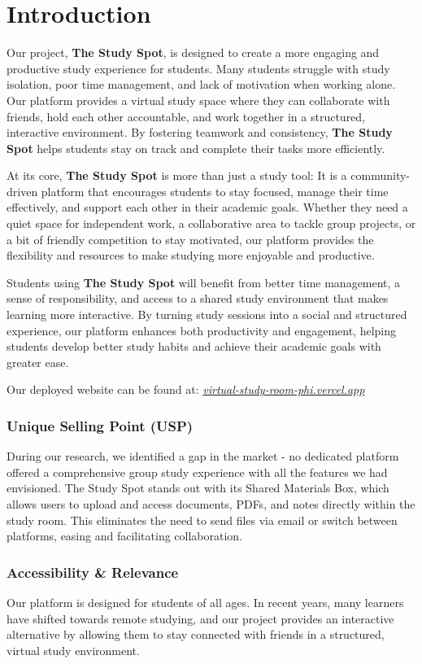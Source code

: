 \chapter{Introduction}
\label{chap:introduction}
Our project, \textbf{The Study Spot}, is designed to create a more engaging and productive study experience for students. Many students struggle with study isolation, poor time management, and lack of motivation when working alone. Our platform provides a virtual study space where they can collaborate with friends, hold each other accountable, and work together in a structured, interactive environment. By fostering teamwork and consistency, \textbf{The Study Spot} helps students stay on track and complete their tasks more efficiently.  

At its core, \textbf{The Study Spot} is more than just a study tool: It is a community-driven platform that encourages students to stay focused, manage their time effectively, and support each other in their academic goals. Whether they need a quiet space for independent work, a collaborative area to tackle group projects, or a bit of friendly competition to stay motivated, our platform provides the flexibility and resources to make studying more enjoyable and productive.  

Students using \textbf{The Study Spot} will benefit from better time management, a sense of responsibility, and access to a shared study environment that makes learning more interactive. By turning study sessions into a social and structured experience, our platform enhances both productivity and engagement, helping students develop better study habits and achieve their academic goals with greater ease.

Our deployed website can be found at:
\href{https://github.com/GummyBearAmnesia/virtual-study-room/blob/main/virtual-study-room-phi.vercel.app}{\textit{virtual-study-room-phi.vercel.app}}

\subsection*{Unique Selling Point (USP)}
During our research, we identified a gap in the market - no dedicated platform offered a comprehensive group study experience with all the features we had envisioned. The Study Spot stands out with its Shared Materials Box, which allows users to upload and access documents, PDFs, and notes directly within the study room. This eliminates the need to send files via email or switch between platforms, easing and facilitating collaboration.

\subsection*{Accessibility \& Relevance}
Our platform is designed for students of all ages. In recent years, many learners have shifted towards remote studying, and our project provides an interactive alternative by allowing them to stay connected with friends in a structured, virtual study environment.

